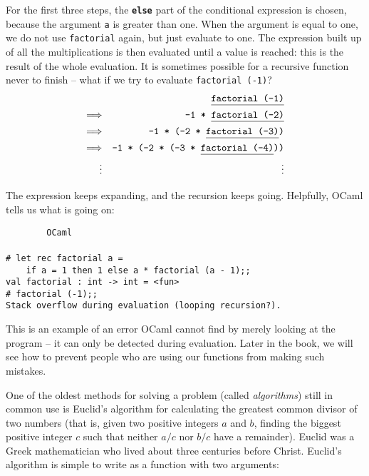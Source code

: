 \documentclass[]{book}
\newcommand{\smspace}{\vspace{4mm}}
\begin{document}
\noindent For the first three steps, the \textbf{\texttt{else}} part of the conditional expression is chosen, because the argument \texttt{a} is greater than one. When the argument is equal to one, we do not use \texttt{factorial} again, but just evaluate to one. The expression built up of all the multiplications is then evaluated until a value is reached: this is the result of the whole evaluation. It is sometimes possible for a recursive function never to finish -- what if we try to evaluate \texttt{factorial\! (-1)}?
\begin{eqnarray*}
 & & \texttt{\underline{\vphantom{g}factorial (-1)}} \\
 \Longrightarrow & & \texttt{-1 * \underline{\vphantom{g}factorial (-2)}} \\
 \Longrightarrow & & \texttt{-1 * (-2 * \underline{\vphantom{g}factorial (-3)})} \\
 \Longrightarrow & & \texttt{-1 * (-2 * (-3 * \underline{\vphantom{g}factorial (-4)}))}\\
 \vdots && \vdots
\end{eqnarray*}

\noindent The expression keeps expanding, and the recursion keeps going. Helpfully, OCaml tells us what is going on:

\smspace
\noindent\verb!        OCaml!\\
\noindent\\
\noindent\verb!# let rec factorial a =!\\
\noindent\verb!    if a = 1 then 1 else a * factorial (a - 1);;!\\
\noindent\verb!val factorial : int -> int = <fun>!\\
\noindent\texttt{\# factorial (-1);;}\\
\noindent\verb!Stack overflow during evaluation (looping recursion?).!
\smspace

\noindent This is an example of an error OCaml cannot find by merely looking at the program -- it can only be detected during evaluation. Later in the book, we will see how to prevent people who are using our functions from making such mistakes.

One of the oldest methods for solving a problem (called \textit{algorithms}) still in common use is Euclid's algorithm for calculating the greatest common divisor of two numbers (that is, given two positive integers $a$ and $b$, finding the biggest positive integer $c$ such that neither $a / c$ nor $b / c$ have a remainder). Euclid was a Greek mathematician who lived about three centuries before Christ. Euclid's algorithm is simple to write as a function with two arguments:
\end{document}
